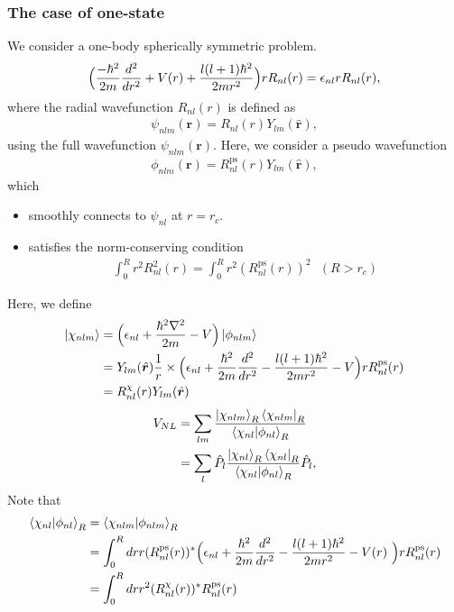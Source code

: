\documentclass{article}
\begin{document}
\subsubsection{The case of one-state}
We consider a one-body spherically symmetric problem.
\begin{align}
  \Bigl(
    \frac{-\hbar^2}{2m} \frac{d^2}{dr^2}
    + V(r)
    + \frac{l(l+1)\hbar^2}{2mr^2} 
  \Bigr)r R_{nl}(r)
  = 
  \epsilon_{nl} r R_{nl}(r),
\end{align}
where the radial wavefunction $R_{nl}(r)$ is defined as 
\begin{align}
  \psi_{nlm}(\bm{r}) = R_{nl}(r) Y_{lm}(\hat{\bm{r}}),
\end{align}
using the full wavefunction $\psi_{nlm}(\bm{r})$.
Here, we consider a pseudo wavefunction 
\begin{align}
  \phi_{nlm}(\bm{r}) = R^{\text{ps}}_{nl}(r) Y_{lm}(\hat{\bm{r}}),
\end{align}
which 
\begin{itemize}
  \item smoothly connects to $\psi_{nl}$ at $r = r_c$.
  \item satisfies the norm-conserving condition
  \begin{align}
    \int_0^{R} r^2 R_{nl}^2 (r) = \int_0^{R} r^2 ( R^{\text{ps}}_{nl} (r) )^2\text{\ \ }(R > r_c)
  \end{align}
\end{itemize}
Here, we define 
\begin{align}
  \ket{\chi_{nlm}} 
  &= \Bigl(\epsilon_{nl} + \frac{\hbar^2\nabla^2}{2m} - V \Bigr)\ket{\phi_{nlm}}
  \nonumber
  \\&=
  Y_{lm}(\hat{\bm{r}})
  \frac{1}{r}
  \times
  \Bigl(\epsilon_{nl} + \frac{\hbar^2}{2m} \frac{d^2}{dr^2} - \frac{l(l+1)\hbar^2}{2mr^2} - V \Bigr) r R^{\text{ps}}_{nl}(r)
  \nonumber
  \\&= 
  R^{\chi}_{nl}(r) Y_{lm}(\hat{\bm{r}})
\end{align}
\begin{align}
  V_{NL} 
  &= \sum_{lm} \frac{\ket{\chi_{nlm}}_R\bra{\chi_{nlm}}_R}{\braket{\chi_{nl} | \phi_{nl}}_R}
  \nonumber
  \\&=
  \sum_{l} \hat{P_l} \frac{\ket{\chi_{nl}}_R\bra{\chi_{nl}}_R}{\braket{\chi_{nl} | \phi_{nl}}_R} \hat{P_l},
\end{align}
Note that 
\begin{align}
  \braket{\chi_{nl} | \phi_{nl}}_R
  &= \braket{\chi_{nlm} | \phi_{nlm}}_R
  \nonumber
  \\&=
  \int_0^R dr r 
  (R^{\text{ps}}_{nl}(r))^* 
  \Bigl(
    \epsilon_{nl} 
    + \frac{\hbar^2}{2m}\frac{d^2}{dr^2} 
    - \frac{l(l+1)\hbar^2}{2mr^2} - V(r) \
  \Bigr) r R^{\text{ps}}_{nl}(r)
  \nonumber
  \\&=
  \int_0^R dr r^2 (R^{\chi}_{nl}(r) )^* R^{\text{ps}}_{nl}(r)
\end{align}
\end{document}
